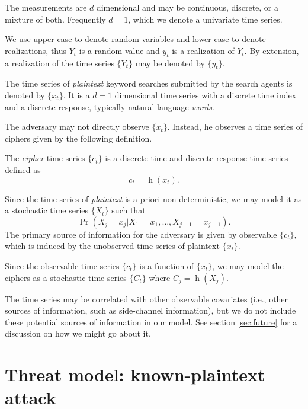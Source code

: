 \documentclass[final,
  11pt,
]{article}
\begin{document}
The measurements are \(d\) dimensional and may be continuous, discrete,
or a mixture of both.
Frequently \(d=1\), which we denote a univariate time series.

We use upper-case to denote random variables and lower-case to denote
realizations, thus \(Y_t\) is a random value and \(y_t\) is a
realization of \(Y_t\).
By extension, a realization of the time series \(\{Y_t\}\) may be denoted
by \(\{y_t\}\).

The time series of \emph{plaintext} keyword searches submitted by the
search agents is denoted by \(\{x_t\}\). It is a \(d=1\) dimensional
time series with a discrete time index and a discrete response, typically
natural language \emph{words}.

The adversary may not directly observe \(\{x_t\}\).
Instead, he observes a time series of ciphers given by the
following definition.
\begin{definition}
The \emph{cipher} time series $\{c_t\}$ is a discrete time and discrete
response time series defined as
\begin{equation}
  c_t = \operatorname{h}(x_t).
\end{equation}
\end{definition}

Since the time series of \emph{plaintext} is a priori non-deterministic,
we may model it as a stochastic time series \(\{X_t\}\) such that
\begin{equation}
    \Pr(X_j = x_j | X_1 = x_1,\ldots,X_{j-1} = x_{j-1}).
\end{equation}
The primary source of information for the adversary is given by observable
\(\{c_t\}\), which is induced by the unobserved time series of plaintext \(\{x_t\}\).

Since the observable time series \(\{c_t\}\) is a function of \(\{x_t\}\),
we may model the ciphers as a stochastic time series \(\{ C_t \}\)
where \(C_j = \operatorname{h}(X_j)\).

The time series may be correlated with other observable
covariates (i.e., other sources of information, such as side-channel
information), but we do not include these potential sources of
information in our model.
See section \ref{sec:future} for a discussion on how we might go
about it.

\hypertarget{threat-model-known-plaintext-attack}{%
\section{Threat model: known-plaintext
attack}\label{threat-model-known-plaintext-attack}}
\end{document}
